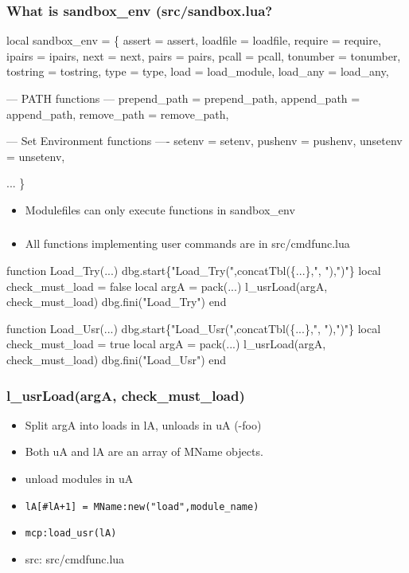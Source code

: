 \documentclass{beamer}
\begin{document}
\begin{frame}[fragile]
\begin{frame}[fragile]
    \frametitle{What is sandbox\_env (src/sandbox.lua?}
 {\tiny
    \begin{semiverbatim}
local sandbox\_env = \{
  assert   = assert,
  loadfile = loadfile,
  require  = require,
  ipairs   = ipairs,
  next     = next,
  pairs    = pairs,
  pcall    = pcall,
  tonumber = tonumber,
  tostring = tostring,
  type     = type,
  load      = load\_module,
  load\_any = load\_any,

  --- PATH functions ---
  prepend\_path         = prepend\_path,
  append\_path          = append\_path,
  remove\_path          = remove\_path,

  --- Set Environment functions ----
  setenv               = setenv,
  pushenv              = pushenv,
  unsetenv             = unsetenv,

  ...
\}
    \end{semiverbatim}
}
  \begin{itemize}
    \item Modulefiles can only execute functions in sandbox\_env
  \end{itemize}
\end{frame}





\begin{frame}[fragile]
    \frametitle{}
  \begin{itemize}
    \item All functions implementing user commands are in src/cmdfunc.lua
  \end{itemize}

 {\tiny
    \begin{semiverbatim}
function Load\_Try(...)
   dbg.start\{"Load\_Try(",concatTbl(\{...\},", "),")"\}
   local check\_must\_load = false
   local argA            = pack(...)
   l\_usrLoad(argA, check\_must\_load)
   dbg.fini("Load\_Try")
end

function Load\_Usr(...)
   dbg.start\{"Load\_Usr(",concatTbl(\{...\},", "),")"\}
   local check\_must\_load = true
   local argA            = pack(...)
   l\_usrLoad(argA, check\_must\_load)
   dbg.fini("Load\_Usr")
end
    \end{semiverbatim}
}
\end{frame}

\begin{frame}[fragile]
    \frametitle{l\_usrLoad(argA, check\_must\_load)}
  \begin{itemize}
    \item Split argA into loads in lA, unloads in uA (-foo)
    \item Both uA and lA are an array of MName objects.
    \item unload modules in uA 
    \item {\color{blue} \texttt{lA[\#lA+1] = MName:new("load",module\_name)}}
    \item {\color{blue} \texttt{mcp:load\_usr(lA)}}
    \item src: src/cmdfunc.lua
  \end{itemize}
\end{frame}


\end{frame}
\end{document}
